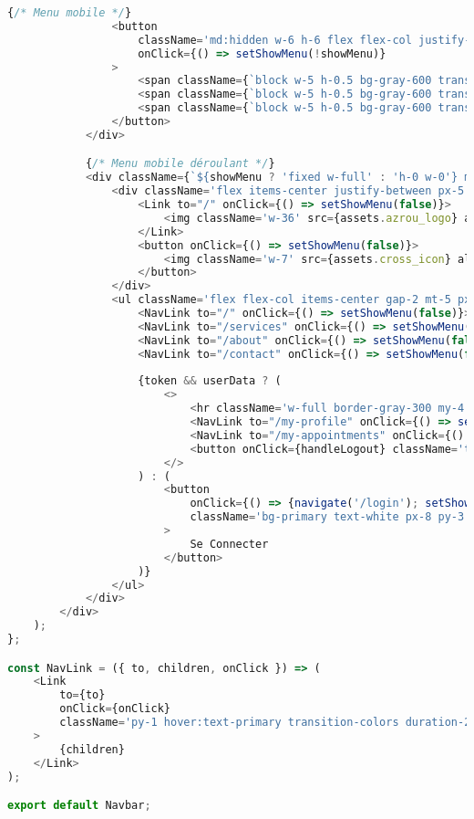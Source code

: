 \begin{lstlisting}[language=JavaScript, caption=Navbar.jsx avec menu mobile]
                {/* Menu mobile */}
                <button 
                    className='md:hidden w-6 h-6 flex flex-col justify-center items-center'
                    onClick={() => setShowMenu(!showMenu)}
                >
                    <span className={`block w-5 h-0.5 bg-gray-600 transition-all duration-300 ${showMenu ? 'rotate-45 translate-y-1.5' : ''}`}></span>
                    <span className={`block w-5 h-0.5 bg-gray-600 transition-all duration-300 ${showMenu ? 'opacity-0' : 'my-1'}`}></span>
                    <span className={`block w-5 h-0.5 bg-gray-600 transition-all duration-300 ${showMenu ? '-rotate-45 -translate-y-1.5' : ''}`}></span>
                </button>
            </div>

            {/* Menu mobile déroulant */}
            <div className={`${showMenu ? 'fixed w-full' : 'h-0 w-0'} md:hidden right-0 top-0 bottom-0 z-20 overflow-hidden bg-white transition-all`}>
                <div className='flex items-center justify-between px-5 py-6'>
                    <Link to="/" onClick={() => setShowMenu(false)}>
                        <img className='w-36' src={assets.azrou_logo} alt="" />
                    </Link>
                    <button onClick={() => setShowMenu(false)}>
                        <img className='w-7' src={assets.cross_icon} alt="Close" />
                    </button>
                </div>
                <ul className='flex flex-col items-center gap-2 mt-5 px-5 text-lg font-medium'>
                    <NavLink to="/" onClick={() => setShowMenu(false)}>ACCUEIL</NavLink>
                    <NavLink to="/services" onClick={() => setShowMenu(false)}>SERVICES</NavLink>
                    <NavLink to="/about" onClick={() => setShowMenu(false)}>À PROPOS</NavLink>
                    <NavLink to="/contact" onClick={() => setShowMenu(false)}>CONTACT</NavLink>
                    
                    {token && userData ? (
                        <>
                            <hr className='w-full border-gray-300 my-4'/>
                            <NavLink to="/my-profile" onClick={() => setShowMenu(false)}>Mon Profil</NavLink>
                            <NavLink to="/my-appointments" onClick={() => setShowMenu(false)}>Mes Rendez-vous</NavLink>
                            <button onClick={handleLogout} className='text-lg font-medium'>Se Déconnecter</button>
                        </>
                    ) : (
                        <button 
                            onClick={() => {navigate('/login'); setShowMenu(false)}}
                            className='bg-primary text-white px-8 py-3 rounded-full font-light mt-4'
                        >
                            Se Connecter
                        </button>
                    )}
                </ul>
            </div>
        </div>
    );
};

const NavLink = ({ to, children, onClick }) => (
    <Link 
        to={to} 
        onClick={onClick}
        className='py-1 hover:text-primary transition-colors duration-200'
    >
        {children}
    </Link>
);

export default Navbar;
\end{lstlisting}

